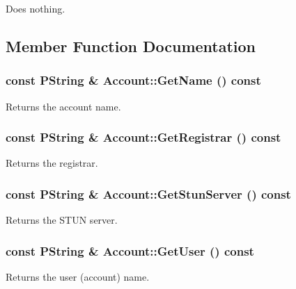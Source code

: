 Does nothing. 

\subsection{Member Function Documentation}
\hypertarget{classAccount_9e97a246120c9a1b032dee5a1182f59d}{
\subsubsection[{GetName}]{\setlength{\rightskip}{0pt plus 5cm}const PString \& Account::GetName () const}}
\label{classAccount_9e97a246120c9a1b032dee5a1182f59d}


Returns the account name. 

\hypertarget{classAccount_147ffe4f7db1e9f987af6a24927f638e}{
\subsubsection[{GetRegistrar}]{\setlength{\rightskip}{0pt plus 5cm}const PString \& Account::GetRegistrar () const}}
\label{classAccount_147ffe4f7db1e9f987af6a24927f638e}


Returns the registrar. 

\hypertarget{classAccount_8e3cc9ed5f4f8bc36b68f352dd34af2c}{
\subsubsection[{GetStunServer}]{\setlength{\rightskip}{0pt plus 5cm}const PString \& Account::GetStunServer () const}}
\label{classAccount_8e3cc9ed5f4f8bc36b68f352dd34af2c}


Returns the STUN server. 

\hypertarget{classAccount_3e372dec415f99fea4aef62356c451c4}{
\subsubsection[{GetUser}]{\setlength{\rightskip}{0pt plus 5cm}const PString \& Account::GetUser () const}}
\label{classAccount_3e372dec415f99fea4aef62356c451c4}


Returns the user (account) name. 

